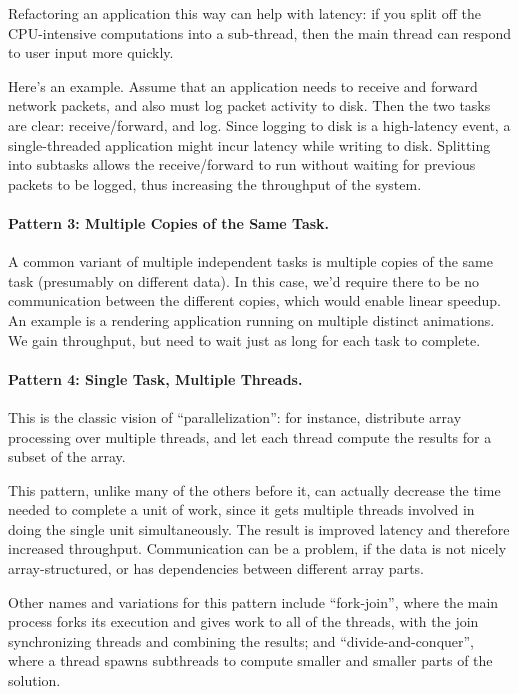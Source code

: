 Refactoring an application this way can help with latency: if you 
split off the CPU-intensive computations into a sub-thread, then
the main thread can respond to user input more quickly.

Here's an example. Assume that an application needs to receive and
forward network packets, and also must log packet activity to disk.
Then the two tasks are clear: receive/forward, and log. Since logging
to disk is a high-latency event, a single-threaded application might
incur latency while writing to disk. Splitting into subtasks allows
the receive/forward to run without waiting for previous packets to be
logged, thus increasing the throughput of the system.

\paragraph{Pattern 3: Multiple Copies of the Same Task.} A common variant of
multiple independent tasks is multiple copies of the same task
(presumably on different data). In this case, we'd require there to be
no communication between the different copies, which would enable
linear speedup. An example is a rendering application running on
multiple distinct animations. We gain throughput, but need to wait
just as long for each task to complete.

\paragraph{Pattern 4: Single Task, Multiple Threads.} This is the classic
vision of ``parallelization'': for instance, distribute array
processing over multiple threads, and let each thread compute the
results for a subset of the array.

This pattern, unlike many of the others before it, can actually
decrease the time needed to complete a unit of work, since it gets
multiple threads involved in doing the single unit simultaneously.
The result is improved latency and therefore increased throughput.
Communication can be a problem, if the data is not nicely
array-structured, or has dependencies between different array parts.

Other names and variations for this pattern include ``fork-join'',
where the main process forks its execution and gives work to all of
the threads, with the join synchronizing threads and combining the
results; and ``divide-and-conquer'', where a thread spawns subthreads
to compute smaller and smaller parts of the solution.


